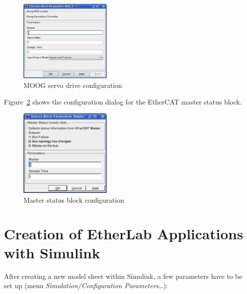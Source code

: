 \begin{figure}[H]
  \begin{center}
    \includegraphics[width=0.4\textwidth]{images/moog_msd.png}
    \caption{MOOG servo drive configuration}
    \label{fig:msd}
  \end{center}
\end{figure}

Figure~\ref{fig:masterstats} shows the configuration dialog for the EtherCAT
master status block.

\begin{figure}[H]
  \begin{center}
    \includegraphics[width=0.4\textwidth]{images/master.png}
    \caption{Master status block configuration}
    \label{fig:masterstats}
  \end{center}
\end{figure}


\section{Creation of EtherLab Applications with Simulink}
\label{sec:simu-apps}

After creating a new model sheet within Simulink, a few parameters have to be
set up (menu \textit{Simulation/Configuration Parameters\ldots}):

